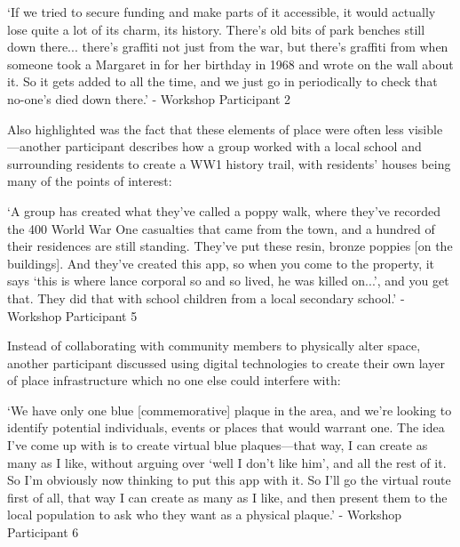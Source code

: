 \begin{displayquote}
`If we tried to secure funding and make parts of it accessible, it would actually lose quite a lot of its charm, its history. There's old bits of park benches still down there... there's graffiti not just from the war, but there's graffiti from when someone took a Margaret in for her birthday in 1968 and wrote on the wall about it. So it gets added to all the time, and we just go in periodically to check that no-one's died down there.' - Workshop Participant 2
\end{displayquote}

Also highlighted was the fact that these elements of place were often less visible---another participant describes how a group worked with a local school and surrounding residents to create a WW1 history trail, with residents' houses being many of the points of interest:

\begin{displayquote}
`A group has created what they've called a poppy walk, where they've recorded the 400 World War One casualties that came from the town, and a hundred of their residences are still standing. They've put these resin, bronze poppies [on the buildings]. And they've created this app, so when you come to the property, it says `this is where lance corporal so and so lived, he was killed on...', and you get that. They did that with school children from a local secondary school.' - Workshop Participant 5
\end{displayquote}

Instead of collaborating with community members to physically alter space, another participant discussed using digital technologies to create their own layer of place infrastructure which no one else could interfere with:

\begin{displayquote}
`We have only one blue [commemorative] plaque in the area, and we're looking to identify potential individuals, events or places that would warrant one. The idea I've come up with is to create virtual blue plaques---that way, I can create as many as I like, without arguing over `well I don't like him', and all the rest of it. So I'm obviously now thinking to put this app with it. So I'll go the virtual route first of all, that way I can create as many as I like, and then present them to the local population to ask who they want as a physical plaque.' - Workshop Participant 6
\end{displayquote}

